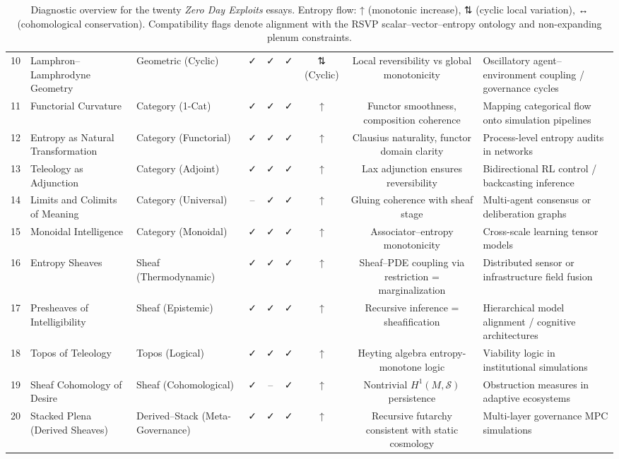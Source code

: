 \begin{table}[H]
\begin{tabular}{@{}cllcccccl@{}}
10 & Lamphron–Lamphrodyne Geometry & Geometric (Cyclic) & ✓ & ✓ & ✓ & ⇅ (Cyclic) & Local reversibility vs global monotonicity & Oscillatory agent–environment coupling / governance cycles \\
11 & Functorial Curvature & Category (1-Cat) & ✓ & ✓ & ✓ & ↑ & Functor smoothness, composition coherence & Mapping categorical flow onto simulation pipelines \\
12 & Entropy as Natural Transformation & Category (Functorial) & ✓ & ✓ & ✓ & ↑ & Clausius naturality, functor domain clarity & Process-level entropy audits in networks \\
13 & Teleology as Adjunction & Category (Adjoint) & ✓ & ✓ & ✓ & ↑ & Lax adjunction ensures reversibility & Bidirectional RL control / backcasting inference \\
14 & Limits and Colimits of Meaning & Category (Universal) & – & ✓ & ✓ & ↑ & Gluing coherence with sheaf stage & Multi-agent consensus or deliberation graphs \\
15 & Monoidal Intelligence & Category (Monoidal) & ✓ & ✓ & ✓ & ↑ & Associator–entropy monotonicity & Cross-scale learning tensor models \\
16 & Entropy Sheaves & Sheaf (Thermodynamic) & ✓ & ✓ & ✓ & ↑ & Sheaf–PDE coupling via restriction = marginalization & Distributed sensor or infrastructure field fusion \\
17 & Presheaves of Intelligibility & Sheaf (Epistemic) & ✓ & ✓ & ✓ & ↑ & Recursive inference = sheafification & Hierarchical model alignment / cognitive architectures \\
18 & Topos of Teleology & Topos (Logical) & ✓ & ✓ & ✓ & ↑ & Heyting algebra entropy-monotone logic & Viability logic in institutional simulations \\
19 & Sheaf Cohomology of Desire & Sheaf (Cohomological) & ✓ & – & ✓ & ↑ & Nontrivial $H^1(M,\mathcal{S})$ persistence & Obstruction measures in adaptive ecosystems \\
20 & Stacked Plena (Derived Sheaves) & Derived–Stack (Meta-Governance) & ✓ & ✓ & ✓ & ↑ & Recursive futarchy consistent with static cosmology & Multi-layer governance MPC simulations \\
\bottomrule
\end{tabular}
\caption{Diagnostic overview for the twenty \emph{Zero Day Exploits} essays. 
Entropy flow: ↑ (monotonic increase), ⇅ (cyclic local variation), ↔ (cohomological conservation). 
Compatibility flags denote alignment with the RSVP scalar–vector–entropy ontology and non-expanding plenum constraints.}
\end{table}

